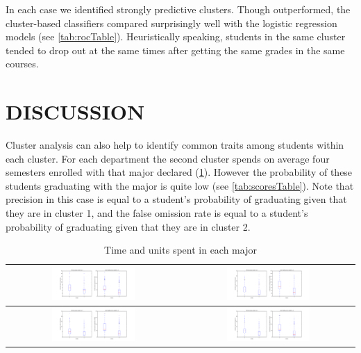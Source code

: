 \documentclass{sigchi}
\begin{document}
In each case we identified strongly predictive clusters. Though outperformed, the cluster-based classifiers compared surprisingly well with the logistic regression models (see \ref{tab:rocTable}). Heuristically speaking, students in the same cluster tended to drop out at the same times after getting the same grades in the same courses. 

\section{DISCUSSION}


Cluster analysis can also help to identify common traits among students within each cluster. For each department the second cluster spends on average four semesters enrolled with that major declared (\ref{tab:boxplotTable}). However the probability of these students graduating with the major is quite low (see \ref{tab:scoresTable}).
Note that precision in this case is equal to a student’s probability of graduating given that they are in cluster 1, and the false omission rate is equal to a student’s probability of graduating given that they are in cluster 2.

\begin{table}[h!]
 \begin{center}
   \begin{tabular}{| c | c |}
   \hline
   \includegraphics[width=0.5\textwidth]{figures/box-Economics}
   &
   \includegraphics[width=0.5\textwidth]{figures/box-Business-Law}
   \\
   \hline
   \includegraphics[width=0.5\textwidth]{figures/box-Marketing}
	&   
   \includegraphics[width=0.5\textwidth]{figures/box-Management}
   \\
   \hline
   \end{tabular}
 \end{center}
  \caption{Time and units spent in each major}~\label{tab:boxplotTable}
\end{table}
\end{document}
